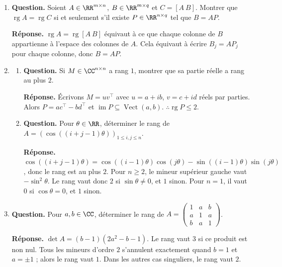 \documentclass[12pt, a4paper]{article}
\begin{document}
\begin{enumerate}[label=6.\arabic*., start=105]
  \item \begin{minipage}[t]{\linewidth}\raggedright
\textbf{Question.} Soient $A\in\RR^{m\times n}$, $B\in\RR^{m\times q}$ et $C=[A\ B]$. Montrer que $\operatorname{rg}A=\operatorname{rg}C$ si et seulement s’il existe $P\in\RR^{n\times q}$ tel que $B=AP$.
\par\smallskip
\textbf{Réponse.} $\operatorname{rg}A=\operatorname{rg}[A\ B]$ équivaut à ce que chaque colonne de $B$ appartienne à l'espace des colonnes de $A$.
    Cela équivaut à écrire $B_j=AP_j$ pour chaque colonne, donc $B=AP$.
\end{minipage}

  \item \begin{minipage}[t]{\linewidth}\raggedright
\begin{enumerate}[\arabic*.]
        \item \textbf{Question.} Si $M\in\CC^{n\times n}$ a rang $1$, montrer que sa partie réelle a rang au plus $2$.
\par\smallskip
\textbf{Réponse.} Écrivons $M=uv^\top$ avec $u=a+ib$, $v=c+id$ réels par parties.
        Alors $P=ac^\top-bd^\top$ et $\operatorname{im}P\subseteq\operatorname{Vect}(a,b)$.
        $\therefore\operatorname{rg}P\leq2$.

  \item \textbf{Question.} Pour $\theta\in\RR$, déterminer le rang de $A=(\cos((i+j-1)\theta))_{1\leq i,j\leq n}$.
\par\smallskip
\textbf{Réponse.} $\cos((i+j-1)\theta)=\cos((i-1)\theta)\cos(j\theta)-\sin((i-1)\theta)\sin(j\theta)$, donc le rang est au plus $2$.
        Pour $n\geq2$, le mineur supérieur gauche vaut $-\sin^2\theta$.
        Le rang vaut donc $2$ si $\sin\theta\neq0$, et $1$ sinon.
        Pour $n=1$, il vaut $0$ si $\cos\theta=0$, et $1$ sinon.

\end{enumerate}
\end{minipage}

  \item \begin{minipage}[t]{\linewidth}\raggedright
\textbf{Question.} Pour $a,b\in\CC$, déterminer le rang de $A=\begin{pmatrix}1&a&b\\a&1&a\\b&a&1\end{pmatrix}$.
\par\smallskip
\textbf{Réponse.} $\det A=(b-1)(2a^2-b-1)$.
    Le rang vaut $3$ si ce produit est non nul.
    Tous les mineurs d'ordre $2$ s'annulent exactement quand $b=1$ et $a=\pm1$ ; alors le rang vaut $1$.
    Dans les autres cas singuliers, le rang vaut $2$.
\end{minipage}


\end{enumerate}
\end{document}
